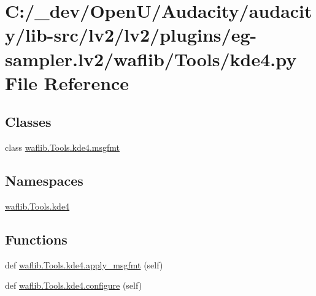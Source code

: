 \hypertarget{lv2_2plugins_2eg-sampler_8lv2_2waflib_2_tools_2kde4_8py}{}\section{C\+:/\+\_\+dev/\+Open\+U/\+Audacity/audacity/lib-\/src/lv2/lv2/plugins/eg-\/sampler.lv2/waflib/\+Tools/kde4.py File Reference}
\label{lv2_2plugins_2eg-sampler_8lv2_2waflib_2_tools_2kde4_8py}
\subsection*{Classes}
\begin{DoxyCompactItemize}
\item 
class \hyperlink{classwaflib_1_1_tools_1_1kde4_1_1msgfmt}{waflib.\+Tools.\+kde4.\+msgfmt}
\end{DoxyCompactItemize}
\subsection*{Namespaces}
\begin{DoxyCompactItemize}
\item 
 \hyperlink{namespacewaflib_1_1_tools_1_1kde4}{waflib.\+Tools.\+kde4}
\end{DoxyCompactItemize}
\subsection*{Functions}
\begin{DoxyCompactItemize}
\item 
def \hyperlink{namespacewaflib_1_1_tools_1_1kde4_a62b36b23c1da96a111189ea65c2c6baa}{waflib.\+Tools.\+kde4.\+apply\+\_\+msgfmt} (self)
\item 
def \hyperlink{namespacewaflib_1_1_tools_1_1kde4_a6ffba63774560559cef87345d1613418}{waflib.\+Tools.\+kde4.\+configure} (self)
\end{DoxyCompactItemize}
